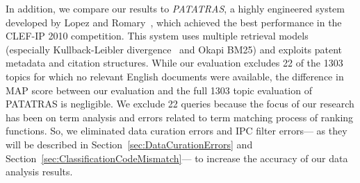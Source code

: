 In addition, we compare our results to \textit{PATATRAS}, a highly engineered system developed by Lopez and Romary~\citep{lopez2010experiments}, which achieved the best performance in the CLEF-IP 2010 competition. This system uses multiple retrieval models (especially Kullback-Leibler divergence~\cite{Baeza-Yates2011} and Okapi BM25) and exploits patent metadata and citation structures.  While our evaluation excludes 22 of the 1303 topics for which no relevant English documents were available, the difference in MAP score between our evaluation and the full 1303 topic evaluation of PATATRAS is negligible. We exclude 22 queries because the focus of our research has been on term analysis and errors related to term matching process of ranking functions. So, we eliminated data curation errors and IPC filter errors--- as they will be described in Section~\ref{sec:DataCurationErrors} and Section~\ref{sec:ClassificationCodeMismatch}--- to increase the accuracy of our data analysis results. 
% 

